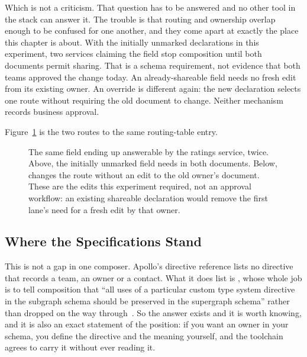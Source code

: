 %
Which is not a criticism. That question has to be answered and no other tool
in the stack can answer it. The trouble is that routing and ownership overlap
enough to be confused for one another, and they come apart at exactly the
place this chapter is about. With the initially unmarked declarations in
this experiment, two services claiming the field stop composition until
both documents permit sharing. That is a schema requirement, not evidence
that both teams approved the change today. An already-shareable field needs
no fresh edit from its existing owner. An override is different again: the
new declaration selects one route without requiring the old document to
change. Neither mechanism records business approval.

%
Figure~\ref{fig:ch17-two-ways-to-move-a-field} is the two routes to the same
routing-table entry.

\begin{figure}[htbp]
  \centering
  
  \caption{The same field ending up answerable by the ratings service, twice.
  Above, the initially unmarked field needs  in both
  documents. Below,  changes the route without an edit to
  the old owner's document. These are the edits this experiment required,
  not an approval workflow: an existing shareable declaration would remove
  the first lane's need for a fresh edit by that owner.}
  \label{fig:ch17-two-ways-to-move-a-field}
\end{figure}

\subsection{Where the Specifications Stand}

%
This is not a gap in one composer. Apollo's directive reference lists no
directive that records a team, an owner or a contact. What it does list is
, whose whole job is to tell composition that
\enquote{all uses of a particular custom type system directive in the subgraph
schema should be preserved in the supergraph schema} rather than dropped on
the way through~\autocite{apollodirectives}. So the answer exists and it is
worth knowing, and it is also an exact statement of the position: if you want
an owner in your schema, you define the directive and the meaning yourself,
and the toolchain agrees to carry it without ever reading it.

